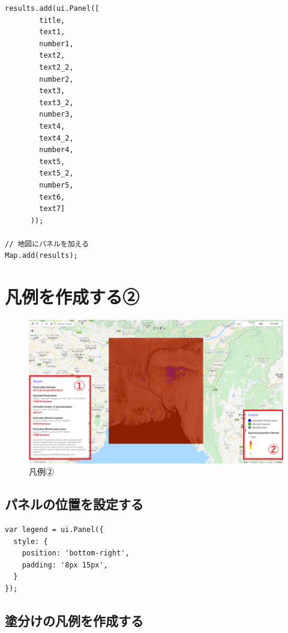 \documentclass[
]{book}
\begin{document}
\begin{verbatim}
results.add(ui.Panel([
        title,
        text1,
        number1,
        text2,
        text2_2,
        number2,
        text3,
        text3_2,
        number3,
        text4,
        text4_2,
        number4,
        text5,
        text5_2,
        number5,
        text6,
        text7]
      ));

// 地図にパネルを加える 
Map.add(results);
\end{verbatim}

\hypertarget{ux51e1ux4f8bux3092ux4f5cux6210ux3059ux308bux2461}{%
\section{凡例を作成する②}\label{ux51e1ux4f8bux3092ux4f5cux6210ux3059ux308bux2461}}

\begin{figure}
\centering
\includegraphics{images/example1.png}
\caption{凡例②}
\end{figure}

\hypertarget{ux30d1ux30cdux30ebux306eux4f4dux7f6eux3092ux8a2dux5b9aux3059ux308b}{%
\subsection{パネルの位置を設定する}\label{ux30d1ux30cdux30ebux306eux4f4dux7f6eux3092ux8a2dux5b9aux3059ux308b}}

\begin{verbatim}
var legend = ui.Panel({
  style: {
    position: 'bottom-right',
    padding: '8px 15px',
  }
});
\end{verbatim}

\hypertarget{ux5857ux5206ux3051ux306eux51e1ux4f8bux3092ux4f5cux6210ux3059ux308b}{%
\subsection{塗分けの凡例を作成する}\label{ux5857ux5206ux3051ux306eux51e1ux4f8bux3092ux4f5cux6210ux3059ux308b}}
\end{document}
